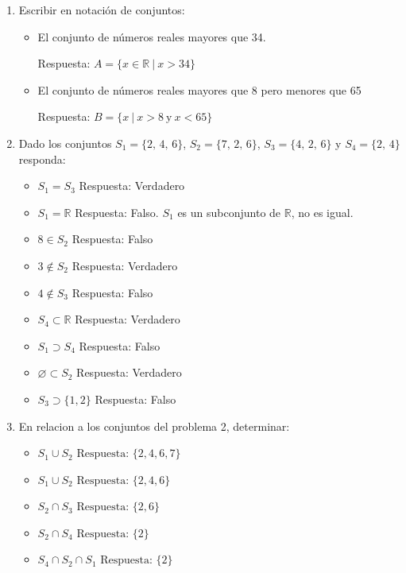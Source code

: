 \begin{ejercicio}
\begin{enumerate}
  \item Escribir en notación de conjuntos:
  \begin{itemize}
    \item El conjunto de números reales mayores que 34. 

    Respuesta: \(A = \{x \in \mathbb{R}~|~ x > 34\}\)
    \item El conjunto de números reales mayores que 8 pero menores que 65
    
    Respuesta: \(B = \{x ~|~ x > 8 ~\text{y}~ x < 65 \}\)
  \end{itemize}
  \item Dado los conjuntos \(S_1 = \{2 ,\,  4 ,\, 6\}\), \(S_2 = \{7 ,\,  2 ,\, 6\}\), 
  \(S_3 = \{4 ,\,  2 ,\, 6\}\) y \(S_4 = \{2 ,\,  4\}\) responda: 
    \begin{itemize}
        \item \(S_1 = S_3\)  Respuesta: Verdadero
        \item \(S_1 = \mathbb{R}\)  Respuesta: Falso. \(S_1\) es un subconjunto de \(\mathbb{R}\), no es igual.
        \item \(8 \in S_2\)  Respuesta: Falso
        \item \(3 \notin S_2\)  Respuesta: Verdadero
        \item \(4 \notin S_3\)  Respuesta: Falso
        \item \(S_4 \subset \mathbb{R} \)  Respuesta: Verdadero
        \item \(S_1 \supset S_4\)  Respuesta: Falso
        \item \(\varnothing \subset S_2\)  Respuesta: Verdadero
        \item \(S_3 \supset \{1,2\}\)  Respuesta: Falso
    \end{itemize}
  \item En relacion a los conjuntos del problema 2, determinar:
    \begin{itemize}
        \item \(S_1 \cup S_2 \text{ Respuesta: } \{2,4,6,7\}\)
        \item \(S_1 \cup S_2 \text{ Respuesta: } \{2,4,6\}\) 
        \item \(S_2 \cap S_3 \text{ Respuesta: } \{2,6\}\)
        \item \(S_2 \cap S_4 \text{ Respuesta: } \{2\}\)
        \item \(S_4 \cap S_2 \cap S_1 \text{ Respuesta: } \{2\}\)

\end{itemize}
\end{enumerate}
\end{ejercicio}
